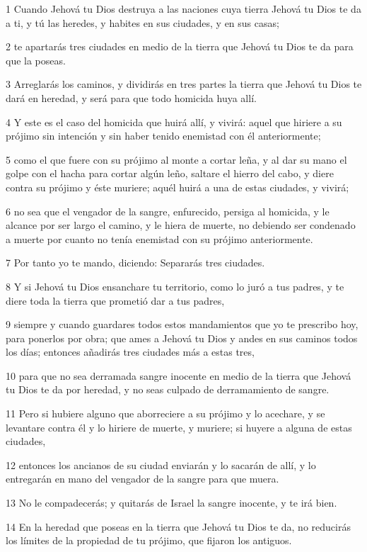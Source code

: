 \par 1 Cuando Jehová tu Dios destruya a las naciones cuya tierra Jehová tu Dios te da a ti, y tú las heredes, y habites en sus ciudades, y en sus casas;
\par 2 te apartarás tres ciudades en medio de la tierra que Jehová tu Dios te da para que la poseas.
\par 3 Arreglarás los caminos, y dividirás en tres partes la tierra que Jehová tu Dios te dará en heredad, y será para que todo homicida huya allí.
\par 4 Y este es el caso del homicida que huirá allí, y vivirá: aquel que hiriere a su prójimo sin intención y sin haber tenido enemistad con él anteriormente;
\par 5 como el que fuere con su prójimo al monte a cortar leña, y al dar su mano el golpe con el hacha para cortar algún leño, saltare el hierro del cabo, y diere contra su prójimo y éste muriere; aquél huirá a una de estas ciudades, y vivirá;
\par 6 no sea que el vengador de la sangre, enfurecido, persiga al homicida, y le alcance por ser largo el camino, y le hiera de muerte, no debiendo ser condenado a muerte por cuanto no tenía enemistad con su prójimo anteriormente.
\par 7 Por tanto yo te mando, diciendo: Separarás tres ciudades.
\par 8 Y si Jehová tu Dios ensanchare tu territorio, como lo juró a tus padres, y te diere toda la tierra que prometió dar a tus padres,
\par 9 siempre y cuando guardares todos estos mandamientos que yo te prescribo hoy, para ponerlos por obra; que ames a Jehová tu Dios y andes en sus caminos todos los días; entonces añadirás tres ciudades más a estas tres,
\par 10 para que no sea derramada sangre inocente en medio de la tierra que Jehová tu Dios te da por heredad, y no seas culpado de derramamiento de sangre.
\par 11 Pero si hubiere alguno que aborreciere a su prójimo y lo acechare, y se levantare contra él y lo hiriere de muerte, y muriere; si huyere a alguna de estas ciudades,
\par 12 entonces los ancianos de su ciudad enviarán y lo sacarán de allí, y lo entregarán en mano del vengador de la sangre para que muera.
\par 13 No le compadecerás; y quitarás de Israel la sangre inocente, y te irá bien.
\par 14 En la heredad que poseas en la tierra que Jehová tu Dios te da, no reducirás los límites de la propiedad de tu prójimo, que fijaron los antiguos.

